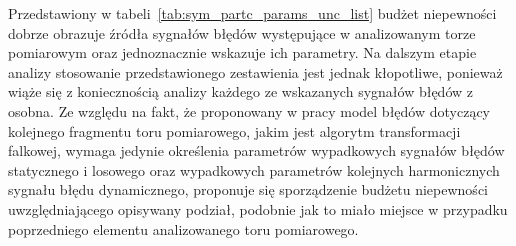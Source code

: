 Przedstawiony w tabeli~\ref{tab:sym_partc_params_unc_list} budżet niepewności dobrze obrazuje źródła sygnałów błędów występujące w analizowanym torze pomiarowym oraz jednoznacznie wskazuje ich parametry. Na dalszym etapie analizy stosowanie przedstawionego zestawienia jest jednak kłopotliwe, ponieważ wiąże się z koniecznością analizy każdego ze wskazanych sygnałów błędów z osobna. Ze względu na fakt, że proponowany w pracy model błędów dotyczący kolejnego fragmentu toru pomiarowego, jakim jest algorytm transformacji falkowej, wymaga jedynie określenia parametrów wypadkowych sygnałów błędów statycznego i losowego oraz wypadkowych parametrów kolejnych harmonicznych sygnału błędu dynamicznego, proponuje się sporządzenie budżetu niepewności uwzględniającego opisywany podział, podobnie jak to miało miejsce w przypadku poprzedniego elementu analizowanego toru pomiarowego.

